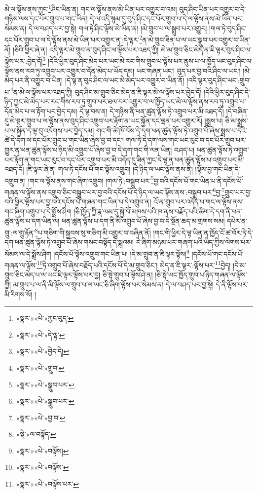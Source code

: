 མེ་ལ་ལྟོས་ནས་ཀྱང་\footnote{«སྣར་»«པེ་»ཀྱང་བུད་}ཤིང་ཡིན་ན། གང་ལ་ལྟོས་ནས་མེ་ཡིན་པར་འགྱུར་བ་འམ། བུད་ཤིང་ཡིན་པར་འགྱུར་བ་དེ་གཉིས་ལས་དང་པོར་གྲུབ་པ་གང་ཡིན། དེ་ལ་འདི་སྙམ་དུ་བུད་ཤིང་དང་པོར་གྲུབ་པ་དེ་ལ་ལྟོས་ནས་མེ་ཡིན་པར་སེམས་ན། དེ་ལ་བཤད་པར་བྱ་སྟེ། གལ་ཏེ་ཤིང་ལྟོས་མེ་ཡིན་ན། །མེ་གྲུབ་པ་ལ་སྒྲུབ་པར་འགྱུར། །གལ་ཏེ་བུད་ཤིང་དང་པོར་གྲུབ་པ་ལ་དེ་ལྟོས་ནས་མེ་ཡིན་པར་འགྱུར་ན་:དེ་ལྟར་\footnote{«སྣར་»«པེ་»དེ་ལྟ་}ན་མེ་གྲུབ་ཟིན་པ་ལ་ཡང་སྒྲུབ་པར་འགྱུར་བ་ཡིན་ནོ། །ཅིའི་ཕྱིར་ཞེ་ན། འདི་ལྟར་མེ་གྲུབ་ན་བུད་ཤིང་ལ་ལྟོས་པར་འཐད་ཀྱི། མེ་མ་གྲུབ་ཅིང་མེད་ན་ཇི་ལྟར་བུད་ཤིང་ལ་ལྟོས་པར་:བྱེད་དོ།\footnote{«སྣར་»«པེ་»བྱེད་དེ།} །དེའི་ཕྱིར་བུད་ཤིང་མེད་པར་ཡང་མེ་རང་གིས་གྲུབ་པ་ལྟོས་པར་ནུས་པ་ལ་ཁྱོད་ཡང་བུད་ཤིང་ལ་ལྟོས་ནས་རབ་ཏུ་འགྲུབ་པར་འགྱུར་བ་དོན་མེད་པ་ཡོད་དམ། ཡང་གཞན་ཡང་། བུད་པར་བྱ་བའི་ཤིང་ལ་ཡང་། །མེ་མེད་པར་ནི་འགྱུར་བ་ཡིན། །དེ་ལྟ་ན་བུད་ཤིང་ལ་ཡང་མེ་མེད་པར་འགྱུར་བ་ཡིན་ནོ། །འདི་ལྟར་བུད་ཤིང་ཡང་:གྲུབ་པ་\footnote{«སྣར་»«པེ་»གྲུབ་}ན་མེ་ལ་ལྟོས་པར་འཐད་ཀྱི། བུད་ཤིང་མ་གྲུབ་ཅིང་མེད་ན་ཇི་ལྟར་མེ་ལ་ལྟོས་པར་བྱེད་དོ། །དེའི་ཕྱིར་བུད་ཤིང་དེ་ཉིད་ཀྱང་མེ་མེད་པར་རང་གིས་རབ་ཏུ་གྲུབ་པར་ཐལ་བར་འགྱུར་བ་ལ་ཁྱོད་ཡང་མེ་ལ་ལྟོས་ནས་རབ་ཏུ་འགྲུབ་པ་དོན་མེད་པ་ལ་རྟོག་པར་བྱེད་དམ། དེ་ལྟ་བས་ན། དེ་གཉིས་ནི་ཕན་ཚུན་ལྟོས་ཏེ་འགྲུབ་པར་མི་འཐད་དོ། །དེ་བཞིན་དུ་མེ་སྔར་གྲུབ་པ་ལ་ལྟོས་ནས་བུད་ཤིང་འགྲུབ་པར་རྟོག་ན་ཡང་སྐྱོན་དང་ལྡན་པར་འགྱུར་རོ། །སྨྲས་པ། ཅི་མ་སྨྲས་པ་ལ་སྐྱོན་དེ་ལྟ་བུ་འདོགས་པར་བྱེད་དམ། གང་གི་ཚེ་ཁོ་བོས་དེ་དག་ཕན་ཚུན་ལྟོས་ཏེ་འགྲུབ་པོ་ཞེས་སྨྲས་པ་དེའི་ཚེ་དེ་དག་ལ་དང་པོར་གྲུབ་པ་གང་ཡིན་ཞེས་བྱ་བ་དང་། གལ་ཏེ་དེ་དག་ལས་གང་ཡང་རུང་བ་དང་པོར་གྲུབ་པར་གྱུར་ན་ཕན་ཚུན་ལྟོས་པ་ཉིད་མི་འགྲུབ་པོ་ཞེས་བྱ་བ་དེ་དག་གང་གི་ལན་ཡིན། བཤད་པ། ཕན་ཚུན་ལྟོས་ཏེ་འགྲུབ་པར་རྟོག་ན་གང་ཡང་རུང་བ་དང་པོར་འགྲུབ་པར་མི་འདོད་དུ་ཟིན་ཀྱང་དེ་ལྟ་ན་ཕན་ཚུན་ལྟོས་པ་འགྲུབ་པར་མི་འཐད་དོ། །ཇི་ལྟར་ཞེ་ན། གལ་ཏེ་དངོས་པོ་གང་ལྟོས་འགྲུབ། །དེ་ཉིད་ལ་ཡང་ལྟོས་ནས་ནི། །ལྟོས་བྱ་གང་ཡིན་དེ་འགྲུབ་ན། །གང་ལ་ལྟོས་ནས་གང་ཞིག་འགྲུབ། །གལ་ཏེ་:བསྒྲུབ་པར་\footnote{«སྣར་»«པེ་»སྒྲུབ་པར་}བྱ་བའི་དངོས་པོ་གང་ཡིན་པ་ནི་དངོས་པོ་གཞན་ལ་ལྟོས་ནས་འགྲུབ་ཅིང་བསྒྲུབ་པར་བྱ་བའི་དངོས་པོ་དེ་ཉིད་ལ་ཡང་ལྟོས་ནས་:བསྒྲུབ་པར་\footnote{«སྣར་»«པེ་»སྒྲུབ་པར་}བྱ་\footnote{«སྣར་»«པེ་»བྱ་བ་}གྲུབ་པར་བྱ་བའི་ཕྱིར་ལྟོས་པར་བྱ་བའི་དངོས་པོ་གཞན་གང་ཡིན་པ་དེ་འགྲུབ་ན། འོ་ན་གྲུབ་པར་འདོད་པ་གང་ལ་ལྟོས་ནས་གང་ཞིག་འགྲུབ་པ་དེ་སྨྲོས་ཤིག །ཅི་ཁྱོད་ཀྱི་རྣ་ལམ་དུ་སྐྱེ་བོ་མཁས་པའི་ཁ་ནས་བརྗོད་པའི་ཚིག་དེ་དག་ནི་ཕན་ཚུན་ལྟོས་པ་དག་ཡིན་ལ། ཕན་ཚུན་ལྟོས་པ་དག་ནི་མི་འགྲུབ་པོ་ཞེས་བྱ་བ་དེ་སྔོན་ཆད་མ་གྲགས་སམ། དཔེར་ན་གྲུ་:ལ་གྲུ་རྟོན་\footnote{«སྡེ་»ལ་བསྟོད་}པ་གཅིག་གི་སྐྱབས་སུ་གཅིག་མི་འགྱུར་བ་བཞིན་ནོ། །གང་གི་ཕྱིར་དེ་ལྟ་ཡིན་ན་ཁྱོད་ངོ་ཚ་བོར་ཏེ་དེ་དག་ཕན་ཚུན་ལྟོས་ཏེ་འགྲུབ་པོ་ཞེས་གསང་བསྟོད་དེ་སྨྲའམ། རེ་ཞིག་མཉམ་པར་གཞག་པའི་ཡིད་ཀྱིས་ལེགས་པར་སོམས་ལ་དེ་སྨྲོས་ཤིག །དངོས་པོ་ལྟོས་འགྲུབ་གང་ཡིན་པ། །དེ་མ་གྲུབ་ན་ཇི་ལྟར་ལྟོས།\footnote{«སྣར་»«པེ་»བལྟོས།} །དངོས་པོ་གང་དངོས་པོ་གཞན་ལ་ལྟོས་\footnote{«སྣར་»«པེ་»བལྟོས་}ཏེ་འགྲུབ་པོ་ཞེས་བརྗོད་པའི་དངོས་པོ་དེ་མ་གྲུབ་ཅིང་། མེད་ན་ཇི་ལྟར་:ལྟོས་པར་\footnote{«སྣར་»«པེ་»བལྟོས་པར་}བྱེད། །དེ་མ་གྲུབ་ཅིང་མེད་པ་ལ་ཡང་ཇི་ལྟར་ལྟོས་པར་བྱ། ཅི་སྟེ་གྲུབ་པ་ལྟོས་ཤེ་ན། །ཅི་སྟེ་ཡང་ཁྱོད་གྲུབ་པ་ཉིད་གཞན་ལ་ལྟོས་ཀྱི། མ་གྲུབ་པ་ལ་ནི་མི་ལྟོས་ལ་གྲུབ་པ་ལ་ཡང་ཅི་ཞིག་ལྟོས་པར་སེམས་ན། དེ་ལ་བཤད་པར་བྱ་སྟེ། དེ་ནི་ལྟོས་པར་མི་རིགས་སོ། །

